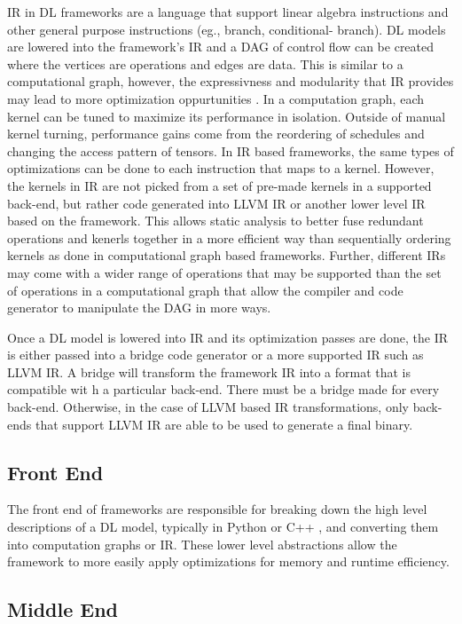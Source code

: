 IR in DL frameworks are a language that support linear algebra instructions and
other general purpose instructions (eg., branch, conditional- branch). DL
models are lowered into the framework's IR and a DAG of control flow
\cite{ngraph} can be created where the vertices are operations and edges are
data. This is similar to a computational graph, however, the expressivness and
modularity that IR provides may lead to more optimization oppurtunities
\cite{DLVM}. In a computation graph, each kernel can be tuned to maximize its
performance in isolation. Outside of manual kernel turning, performance gains
come from the reordering of schedules and changing the access pattern of
tensors.  In IR based frameworks, the same types of optimizations can be done
to each instruction that maps to a kernel. However, the kernels in IR are not
picked from a set of pre-made kernels in a supported back-end, but rather code
generated into LLVM IR or another lower level IR based on the framework. This
allows static analysis to better fuse redundant operations and kenerls together
in a more efficient way than sequentially ordering kernels as done in
computational graph based frameworks. Further, different IRs may come with
a wider range of operations that may be supported than the set of operations in
a computational graph that allow the compiler and code generator to manipulate
the DAG in more ways.

Once a DL model is lowered into IR and its optimization passes are done, the IR
is either passed into a bridge code generator or a more supported IR such as
LLVM IR. A bridge will transform the framework IR into a format that is
compatible wit h a particular back-end. There must be a bridge made for every
back-end. Otherwise, in the case of LLVM based IR transformations, only
back-ends that support LLVM IR are able to be used to generate a final binary.


\subsection{Front End}
The front end of frameworks are responsible for breaking down the high level
descriptions of a DL model, typically in Python or C++ \cite{tensorflow}, and
converting them into computation graphs or IR. These lower level abstractions
allow the framework to more easily apply optimizations for memory and runtime
efficiency.

\subsection{Middle End}

